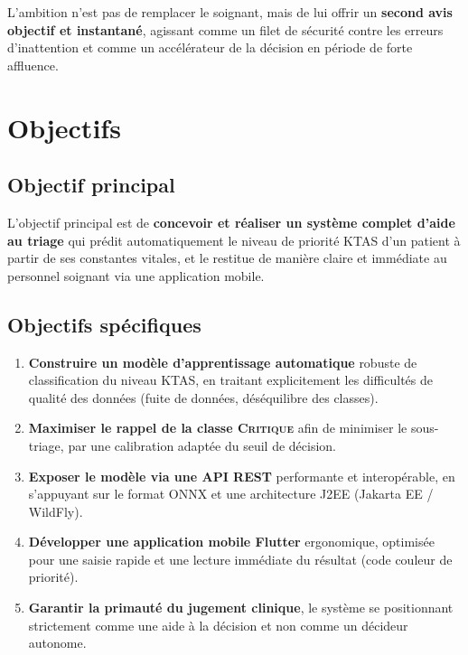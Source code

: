 L'ambition n'est pas de remplacer le soignant, mais de lui offrir un \textbf{second avis
objectif et instantané}, agissant comme un filet de sécurité contre les erreurs
d'inattention et comme un accélérateur de la décision en période de forte affluence.

\section{Objectifs}

\subsection{Objectif principal}
L'objectif principal est de \textbf{concevoir et réaliser un système complet d'aide au
triage} qui prédit automatiquement le niveau de priorité KTAS d'un patient à partir de ses
constantes vitales, et le restitue de manière claire et immédiate au personnel soignant via
une application mobile.

\subsection{Objectifs spécifiques}
\begin{enumerate}
  \item \textbf{Construire un modèle d'apprentissage automatique} robuste de classification
  du niveau KTAS, en traitant explicitement les difficultés de qualité des données (fuite de
  données, déséquilibre des classes).
  \item \textbf{Maximiser le rappel de la classe \textsc{Critique}} afin de minimiser le
  sous-triage, par une calibration adaptée du seuil de décision.
  \item \textbf{Exposer le modèle via une API REST} performante et interopérable, en
  s'appuyant sur le format ONNX et une architecture J2EE (Jakarta EE / WildFly).
  \item \textbf{Développer une application mobile Flutter} ergonomique, optimisée pour une
  saisie rapide et une lecture immédiate du résultat (code couleur de priorité).
  \item \textbf{Garantir la primauté du jugement clinique}, le système se positionnant
  strictement comme une aide à la décision et non comme un décideur autonome.
\end{enumerate}

